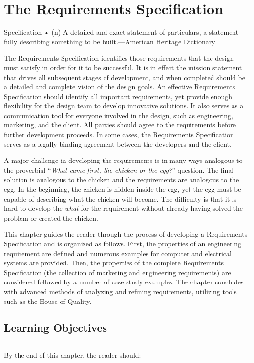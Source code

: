 \chapter{The Requirements Specification}
\graphicspath{ {./chapter03/Fig} }

\begin{itquote}
Specification • (n) A detailed and exact statement of particulars, a
statement fully describing something to be built.---American Heritage
Dictionary
\end{itquote}

The Requirements Specification identifies those requirements that the
design must satisfy in order for it to be successful. It is in effect
the mission statement that drives all subsequent stages of development,
and when completed should be a detailed and complete vision of the
design goals. An effective Requirements Specification should identify
all important requirements, yet provide enough flexibility for the
design team to develop innovative solutions. It also serves as a
communication tool for everyone involved in the design, such as
engineering, marketing, and the client. All parties should agree to the
requirements before further development proceeds. In some cases, the
Requirements Specification serves as a legally binding agreement between
the developers and the client.

A major challenge in developing the requirements is in many ways
analogous to the proverbial ``\emph{What came first, the chicken or the
egg?}'' question. The final solution is analogous to the chicken and the
requirements are analogous to the egg. In the beginning, the chicken is
hidden inside the egg, yet the egg must be capable of describing what
the chicken will become. The difficulty is that it is hard to develop
the \emph{what} for the requirement without already having solved the
problem or created the chicken.

This chapter guides the reader through the process of developing a
Requirements Specification and is organized as follows. First, the
properties of an engineering requirement are defined and numerous
examples for computer and electrical systems are provided. Then, the
properties of the complete Requirements Specification (the collection of
marketing and engineering requirements) are considered followed by a
number of case study examples. The chapter concludes with advanced
methods of analyzing and refining requirements, utilizing tools such as
the House of Quality.

\section*{Learning Objectives}
\noindent\rule{\linewidth}{1pt}
By the end of this chapter, the reader should:

